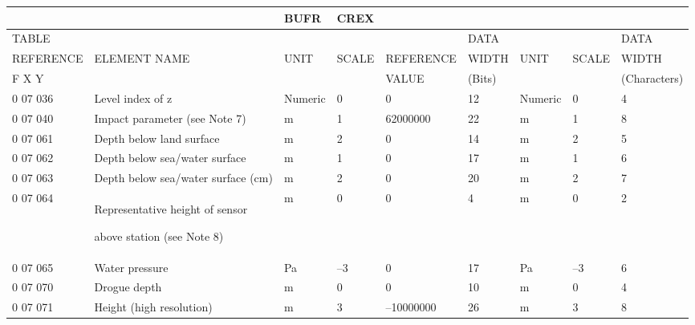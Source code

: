 \begin{longtable}[]{@{}lllllllll@{}}
\toprule
& & BUFR & CREX & & & & &\tabularnewline
\midrule
\endhead
TABLE & & & & & DATA & & & DATA\tabularnewline
REFERENCE & ELEMENT NAME & UNIT & SCALE & REFERENCE & WIDTH & UNIT & SCALE & WIDTH\tabularnewline
F X Y & & & & VALUE & (Bits) & & & (Characters)\tabularnewline
0 07 036 & Level index of z & Numeric & 0 & 0 & 12 & Numeric & 0 & 4\tabularnewline
0 07 040 & Impact parameter (see Note 7) & m & 1 & 62000000 & 22 & m & 1 & 8\tabularnewline
0 07 061 & Depth below land surface & m & 2 & 0 & 14 & m & 2 & 5\tabularnewline
0 07 062 & Depth below sea/water surface & m & 1 & 0 & 17 & m & 1 & 6\tabularnewline
0 07 063 & Depth below sea/water surface (cm) & m & 2 & 0 & 20 & m & 2 & 7\tabularnewline
\begin{minipage}[t]{0.08\columnwidth}\raggedright
0 07 064\strut
\end{minipage} & \begin{minipage}[t]{0.08\columnwidth}\raggedright
Representative height of sensor

above station (see Note 8)\strut
\end{minipage} & \begin{minipage}[t]{0.08\columnwidth}\raggedright
m\strut
\end{minipage} & \begin{minipage}[t]{0.08\columnwidth}\raggedright
0\strut
\end{minipage} & \begin{minipage}[t]{0.08\columnwidth}\raggedright
0\strut
\end{minipage} & \begin{minipage}[t]{0.08\columnwidth}\raggedright
4\strut
\end{minipage} & \begin{minipage}[t]{0.08\columnwidth}\raggedright
m\strut
\end{minipage} & \begin{minipage}[t]{0.08\columnwidth}\raggedright
0\strut
\end{minipage} & \begin{minipage}[t]{0.08\columnwidth}\raggedright
2\strut
\end{minipage}\tabularnewline
0 07 065 & Water pressure & Pa & --3 & 0 & 17 & Pa & --3 & 6\tabularnewline
0 07 070 & Drogue depth & m & 0 & 0 & 10 & m & 0 & 4\tabularnewline
0 07 071 & Height (high resolution) & m & 3 & --10000000 & 26 & m & 3 & 8\tabularnewline
\bottomrule
\end{longtable}

